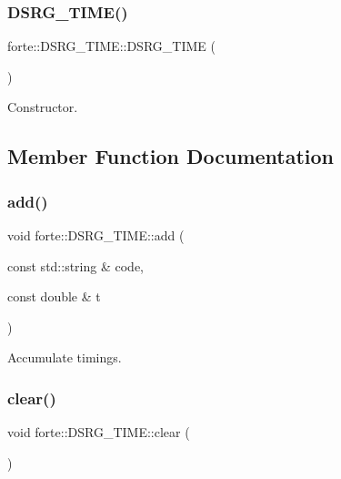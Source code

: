\subsubsection{\texorpdfstring{D\+S\+R\+G\+\_\+\+T\+I\+M\+E()}{DSRG\_TIME()}}
{\footnotesize\ttfamily forte\+::\+D\+S\+R\+G\+\_\+\+T\+I\+M\+E\+::\+D\+S\+R\+G\+\_\+\+T\+I\+ME (\begin{DoxyParamCaption}{ }\end{DoxyParamCaption})}



Constructor. 



\subsection{Member Function Documentation}
\mbox{\label{classforte_1_1_d_s_r_g___t_i_m_e_a48dba65b329e97e25265999940156c55}} 
\subsubsection{\texorpdfstring{add()}{add()}}
{\footnotesize\ttfamily void forte\+::\+D\+S\+R\+G\+\_\+\+T\+I\+M\+E\+::add (\begin{DoxyParamCaption}\item[{const std\+::string \&}]{code,  }\item[{const double \&}]{t }\end{DoxyParamCaption})}



Accumulate timings. 

\mbox{\label{classforte_1_1_d_s_r_g___t_i_m_e_afaa13e999c5671b13d6adfa991ad0274}} 
\subsubsection{\texorpdfstring{clear()}{clear()}}
{\footnotesize\ttfamily void forte\+::\+D\+S\+R\+G\+\_\+\+T\+I\+M\+E\+::clear (\begin{DoxyParamCaption}{ }\end{DoxyParamCaption})\hspace{0.3cm}{\ttfamily [inline]}}



